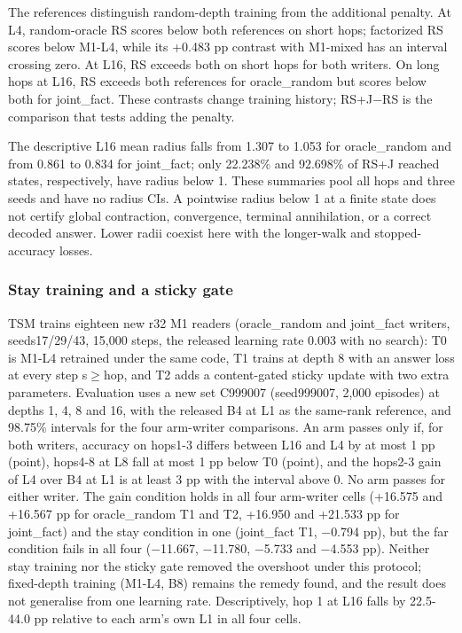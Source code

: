 The references distinguish random-depth training from the additional penalty.
At L4, random-oracle RS scores below both references on short hops; factorized
RS scores below M1-L4, while its +0.483 pp contrast with M1-mixed has an interval
crossing zero. At L16, RS exceeds both on short hops for both writers. On long hops at L16,  %
RS exceeds both references for oracle\_random but scores below both for joint\_fact.
 These contrasts change training history; RS+J\ensuremath{-}RS is the comparison  %
that tests adding the penalty.  %

The descriptive L16 mean radius falls from 1.307 to 1.053 for oracle\_random and
from 0.861 to 0.834 for joint\_fact; only 22.238\% and 92.698\% of RS+J reached states,
respectively, have radius below 1. These summaries pool all hops and  %
three seeds and have no radius CIs. A pointwise radius below 1 at a  %
finite state does not certify global contraction, convergence, terminal
annihilation, or a correct decoded answer. Lower radii coexist here with the
longer-walk and stopped-accuracy losses.  %

\subsubsection*{Stay training and a sticky gate}

TSM trains eighteen new r32 M1 readers (oracle\_random and joint\_fact writers, seeds17/\allowbreak{}29/\allowbreak{}43,
15,000 steps, the released learning rate 0.003 with no search): T0 is M1-L4 retrained under the
same code, T1 trains at depth 8 with an answer loss at every step s\ensuremath{\geq}hop, and T2 adds a
content-gated sticky update with two extra parameters. Evaluation uses a new set C999007
(seed999007, 2,000 episodes) at depths 1, 4, 8 and 16, with the released B4 at L1 as the
same-rank reference, and 98.75\% intervals for the four arm-writer comparisons. An arm passes
only if, for both writers, accuracy on hops1-3 differs between L16 and L4 by at most 1 pp
(point), hops4-8 at L8 fall at most 1 pp below T0 (point), and the hops2-3 gain of L4 over B4 at
L1 is at least 3 pp with the interval above 0. No arm passes for either writer. The  %
gain condition holds in all four arm-writer cells (+16.575 and +16.567 pp for oracle\_random
T1 and T2, +16.950 and +21.533 pp for joint\_fact) and the stay condition in one (joint\_fact T1,
\ensuremath{-}0.794 pp), but the far condition fails in all four (\ensuremath{-}11.667, \ensuremath{-}11.780, \ensuremath{-}5.733 and \ensuremath{-}4.553 pp).
 Neither stay training nor the sticky gate removed the overshoot under this protocol;  %
fixed-depth training (M1-L4, B8) remains the remedy found, and the result does not generalise
from one learning rate. Descriptively, hop 1 at L16 falls by 22.5-44.0 pp relative  %
to each arm’s own L1 in all four cells.  %


